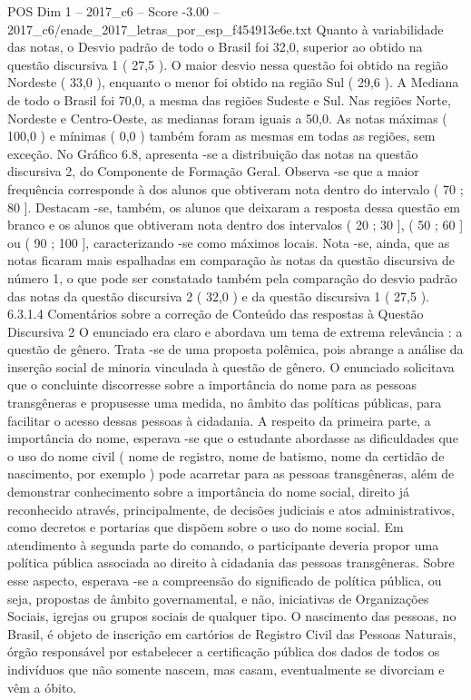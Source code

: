 \begin{textsample}{POS Dim 1 – 2017\_c6 – Score -3.00 – 2017\_c6/enade\_2017\_letras\_por\_esp\_f454913e6e.txt}
Quanto à variabilidade das notas, o Desvio padrão de todo o Brasil foi 32,0, superior ao obtido na questão discursiva 1 ( 27,5 ).
O maior desvio nessa questão foi obtido na região Nordeste ( 33,0 ), enquanto o menor foi obtido na região Sul ( 29,6 ).
A Mediana de todo o Brasil foi 70,0, a mesma das regiões Sudeste e Sul.
Nas regiões Norte, Nordeste e Centro-Oeste, as medianas foram iguais a 50,0.
As notas máximas ( 100,0 ) e mínimas ( 0,0 ) também foram as mesmas em todas as regiões, sem exceção.
No Gráfico 6.8, apresenta -se a distribuição das notas na questão discursiva 2, do Componente de Formação Geral.
Observa -se que a maior frequência corresponde à dos alunos que obtiveram nota dentro do intervalo ( 70 ; 80 ].
Destacam -se, também, os alunos que deixaram a resposta dessa questão em branco e os alunos que obtiveram nota dentro dos intervalos ( 20 ; 30 ], ( 50 ; 60 ] ou ( 90 ; 100 ], caracterizando -se como máximos locais.
Nota -se, ainda, que as notas ficaram mais espalhadas em comparação às notas da questão discursiva de número 1, o que pode ser constatado também pela comparação do desvio padrão das notas da questão discursiva 2 ( 32,0 ) e da questão discursiva 1 ( 27,5 ). 6.3.1.4 Comentários sobre a correção de Conteúdo das respostas à Questão Discursiva 2 O enunciado era claro e abordava um tema de extrema relevância : a questão de gênero.
Trata -se de uma proposta polêmica, pois abrange a análise da inserção social de minoria vinculada à questão de gênero.
O enunciado solicitava que o concluinte discorresse sobre a importância do nome para as pessoas transgêneras e propusesse uma medida, no âmbito das políticas públicas, para facilitar o acesso dessas pessoas à cidadania.
A respeito da primeira parte, a importância do nome, esperava -se que o estudante abordasse as dificuldades que o uso do nome civil ( nome de registro, nome de batismo, nome da certidão de nascimento, por exemplo ) pode acarretar para as pessoas transgêneras, além de demonstrar conhecimento sobre a importância do nome social, direito já reconhecido através, principalmente, de decisões judiciais e atos administrativos, como decretos e portarias que dispõem sobre o uso do nome social.
Em atendimento à segunda parte do comando, o participante deveria propor uma política pública associada ao direito à cidadania das pessoas transgêneras.
Sobre esse aspecto, esperava -se a compreensão do significado de política pública, ou seja, propostas de âmbito governamental, e não, iniciativas de Organizações Sociais, igrejas ou grupos sociais de qualquer tipo.
O nascimento das pessoas, no Brasil, é objeto de inscrição em cartórios de Registro Civil das Pessoas Naturais, órgão responsável por estabelecer a certificação pública dos dados de todos os indivíduos que não somente nascem, mas casam, eventualmente se divorciam e vêm a óbito.

\end{textsample}
